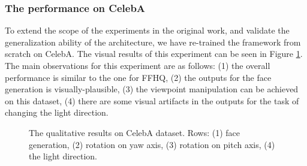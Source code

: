 \subsubsection{The performance on CelebA}
To extend the scope of the experiments in the original work, and validate the generalization ability of the architecture, we have re-trained the framework from scratch on CelebA. The visual results of this experiment can be seen in Figure \ref{fig:celeba_results}. The main observations for this experiment are as follows: (1) the overall performance is similar to the one for FFHQ, (2) the outputs for the face generation is visually-plausible, (3) the viewpoint manipulation can be achieved on this dataset, (4) there are some visual artifacts in the outputs for the task of changing the light direction.


\begin{figure}[t!]
    \centering
    \caption{The qualitative results on CelebA dataset. Rows: (1) face generation, (2) rotation on yaw axis, (3) rotation on pitch axis, (4) the light direction.}
    \label{fig:celeba_results}
\end{figure}


